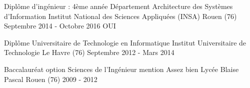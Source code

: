 

\begin{cventries}

  \cventry
    {Diplôme d'ingénieur : 4ème année Département Architecture des Systèmes d'Information} %
    {Institut National des Sciences Appliquées (INSA)} %
    {Rouen (76)} %
    {Septembre 2014 - Octobre 2016} %
    {OUI}
    
    
  \cventryFour
	{Diplôme Universitaire de Technologie en Informatique} %
	{Institut Universitaire de Technologie} %
	{Le Havre (76)} %
	{Septembre 2012 - Mars 2014} %
	{}
	
  \cventryFour
	{Baccalauréat option Sciences de l'Ingénieur mention Assez bien} %
	{Lycée Blaise Pascal} %
	{Rouen (76)} %
	{2009 - 2012} %
	{}
	
	
\end{cventries}
